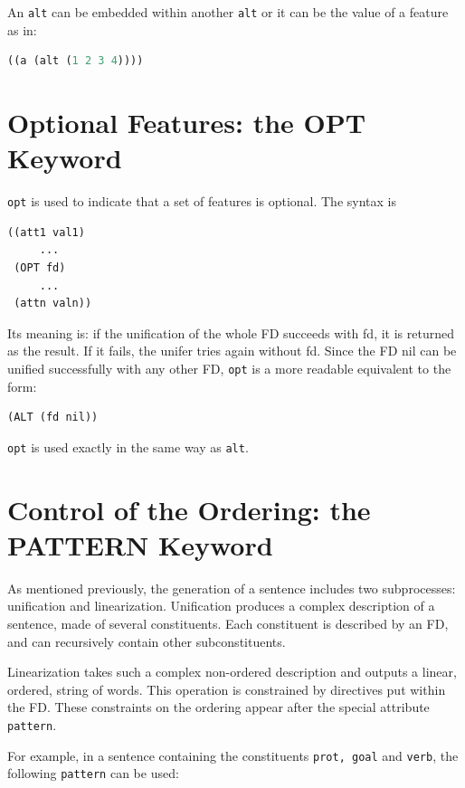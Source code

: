 \documentclass[10pt,a4paper]{report}
\begin{document}
An {\tt alt} can be embedded within another {\tt alt} or it can be the value of
a feature as in:

\begin{lstlisting}[language=Lisp]
((a (alt (1 2 3 4))))
\end{lstlisting}



\section{Optional Features: the OPT Keyword}

{\tt opt} is used to indicate that a set of features is optional. The syntax is

\begin{lstlisting}[language=Lisp]
((att1 val1) 
     ... 
 (OPT fd) 
     ... 
 (attn valn))
\end{lstlisting}

Its meaning is: if the unification of the whole FD succeeds with fd, it is
returned as the result. If it fails, the unifer tries again without fd.
Since the FD nil can be unified successfully with any other FD, {\tt opt} is
a more readable equivalent to the form:

\begin{lstlisting}
(ALT (fd nil))
\end{lstlisting}

{\tt opt} is used exactly in the same way as {\tt alt}.


\section{Control of the Ordering: the PATTERN Keyword}
\label{sect-pattern}

As mentioned previously, the generation of a sentence includes two
subprocesses: unification and linearization.  Unification produces a
complex description of a sentence, made of several constituents.  Each
constituent is described by an FD, and can recursively contain other
subconstituents.

Linearization takes such a complex non-ordered description and outputs a
linear, ordered, string of words. This operation is constrained by
directives put within the FD. These constraints on the ordering appear
after the special attribute {\tt pattern}.

For example, in a sentence containing the constituents {\tt prot,
goal} and {\tt verb}, the following {\tt pattern} can be used:
\end{document}
